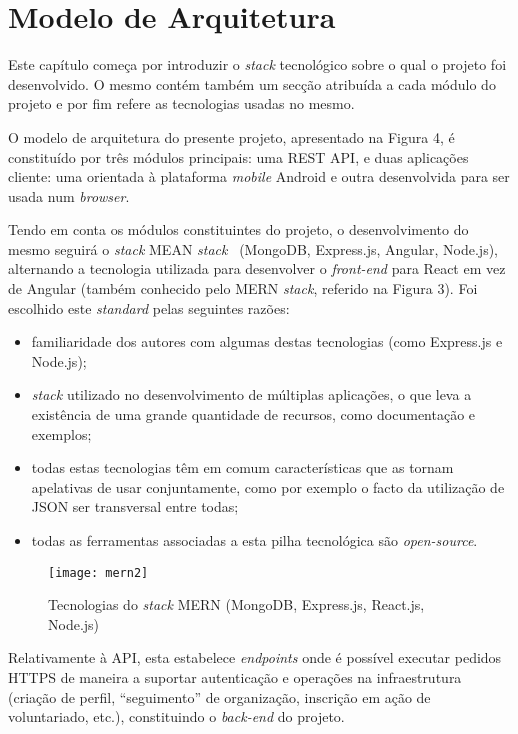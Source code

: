 \section{Modelo de Arquitetura} 
Este capítulo começa por introduzir o \textit{stack} tecnológico sobre o qual o projeto foi desenvolvido. O mesmo contém também um secção atribuída a cada módulo do projeto e por fim refere as tecnologias usadas no mesmo.
\par \medskip

O modelo de arquitetura do presente projeto, apresentado na Figura 4, é constituído por três módulos principais: uma REST API, e duas aplicações cliente: uma orientada à plataforma \textit{mobile} Android e outra desenvolvida para ser usada num \textit{browser}. \par \medskip

Tendo em conta os módulos constituintes do projeto, o desenvolvimento do mesmo seguirá o \textit{stack} MEAN \textit{stack}~\cite{mean_stack_explained} (MongoDB, Express.js, Angular, Node.js), alternando a tecnologia utilizada para desenvolver o \textit{front-end} para React em vez de Angular (também conhecido pelo MERN \textit{stack}, referido na Figura 3). Foi escolhido este \textit{standard} pelas seguintes razões:
\begin{itemize}
	\item familiaridade dos autores com algumas destas tecnologias (como Express.js e Node.js);
	\item \textit{stack} utilizado no desenvolvimento de múltiplas aplicações, o que leva a existência de uma grande quantidade de recursos, como documentação e exemplos;
	\item todas estas tecnologias têm em comum características que as tornam apelativas de usar conjuntamente, como por exemplo o facto da utilização de JSON ser transversal entre todas;
	\item todas as ferramentas associadas a esta pilha tecnológica são \textit{open-source}.
\end{itemize}

\begin{figure}[h]
	\centering
	\texttt{[image: mern2]}
	\caption{Tecnologias do \textit{stack} MERN (MongoDB, Express.js, React.js, Node.js)}
\end{figure}

Relativamente à API, esta estabelece \textit{endpoints} onde é possível executar pedidos HTTPS de maneira a suportar autenticação e operações na infraestrutura (criação de perfil, “seguimento” de organização, inscrição em ação de voluntariado, etc.), constituindo o \textit{back-end} do projeto.
\par \medskip

